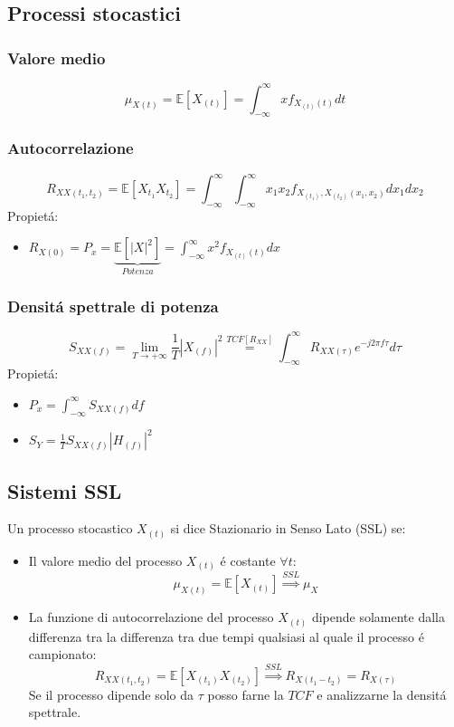     \subsection{Processi stocastici}
        \subsubsection{Valore medio}
            \[
                \mu_{X(t)} = \mathbb{E}[X_{(t)}] = \int_{-\infty}^{\infty}xf_{X_{(t)}(t)}dt
            \]
        \subsubsection{Autocorrelazione}
            \[
                R_{XX(t_1,t_2)} = \mathbb{E}[X_{t_1}X_{t_2}] = \int_{-\infty}^{\infty}\int_{-\infty}^{\infty} x_1x_2f_{X_{(t_1)},X_{(t_2)}(x_1,x_2)}dx_1dx_2
            \]  
            Propietá:
            \begin{itemize}
                \item {$R_{X(0)}=P_x = \underset{Potenza}{\underbrace{\mathbb{E}[|X|^2]}} = \int_{-\infty}^{\infty} x^2f_{X_{(t)}(t)}dx$}
            \end{itemize}
        \subsubsection{Densitá spettrale di potenza}
            \[
                S_{XX(f)} = \lim_{T\rightarrow+\infty}\frac{1}{T}|X_{(f)}|^2 \overset{TCF[R_{XX}]}{=} \int_{-\infty}^{\infty} R_{XX(\tau)} e^{-j2\pi f\tau}d\tau
            \]
            Propietá:
            \begin{itemize}
                \item {$P_x = \int_{-\infty}^{\infty} S_{XX(f)} df$}
                \item {$S_{Y} = \frac{1}{T} S_{XX(f)} |H_{(f)}|^2$}
            \end{itemize}
    \subsection{Sistemi SSL}
        Un processo stocastico $X_{(t)}$ si dice Stazionario in Senso Lato (SSL) se:
        \begin{itemize}
            \item {Il valore medio del processo $X_{(t)}$ é costante $\forall t$:
                \[
                    \mu_{X(t)} = \mathbb{E}[X_{(t)}] \overset{SSL}{\Rightarrow} \mu_{X}    
                \]
            }
            \item {La funzione di autocorrelazione del processo $X_{(t)}$ dipende solamente dalla differenza tra la differenza 
                tra due tempi qualsiasi al quale il processo é campionato:
                \[
                    R_{XX(t_1,t_2)} = \mathbb{E}[X_{(t_1)}X_{(t_2)}] \overset{SSL}{\Rightarrow} R_{X(t_1-t_2)} = R_{X(\tau)}      
                \]
                Se il processo dipende solo da $\tau$ posso farne la $TCF$ e analizzarne la densitá spettrale. 
                }
        \end{itemize}
